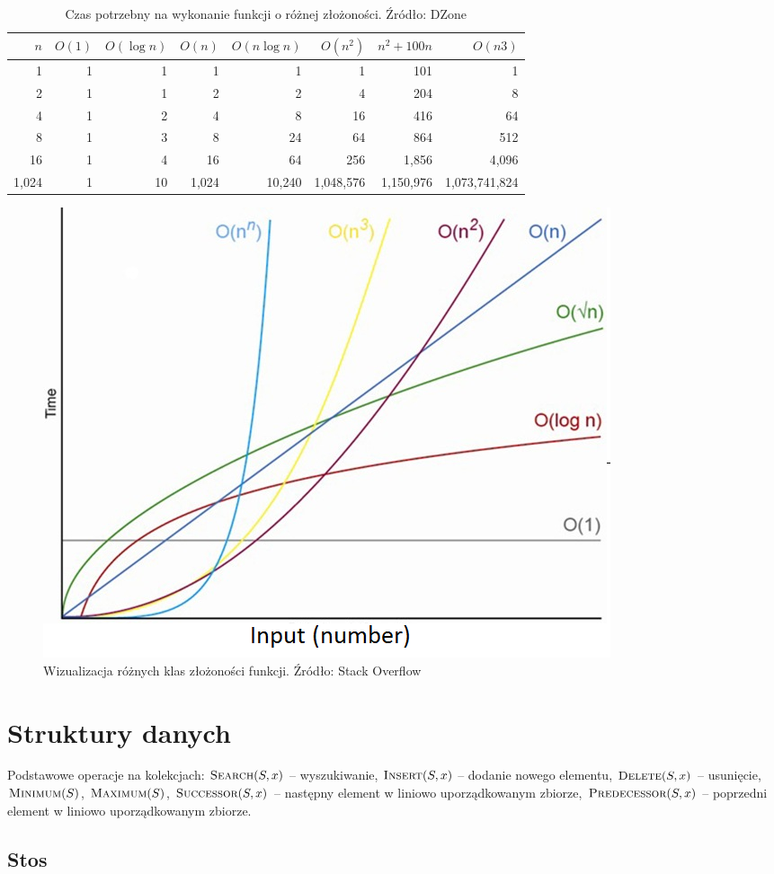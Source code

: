 \documentclass[10pt, oneside]{article}
\theoremstyle{remark}
\begin{document}
\begin{table}[]
\caption{Czas potrzebny na wykonanie funkcji o różnej złożoności. Źródło: DZone}
\centering
\begin{tabular}{@{}rrrrrrrr@{}}
\toprule
$n$ & $O(1)$ & $O(\log n)$ & $O(n)$ & $O(n \log n)$ & $O(n^2)$ & $ n^2 +100n$ & $O(n3)$ \\ \midrule
1 & 1 & 1 & 1 & 1 & 1 & 101 & 1 \\
2 & 1 & 1 & 2 & 2 & 4 & 204 & 8 \\
4 & 1 & 2 & 4 & 8 & 16 & 416 & 64 \\
8 & 1 & 3 & 8 & 24 & 64 & 864 & 512 \\
16 & 1 & 4 & 16 & 64 & 256 & 1,856 & 4,096 \\
1,024 & 1 & 10 & 1,024 & 10,240 & 1,048,576 & 1,150,976 & 1,073,741,824 \\
\bottomrule
\end{tabular}
\end{table}

\begin{figure}
	\centering
	\includegraphics[width=.4\textwidth]{figures/complexities}
	\caption{Wizualizacja różnych klas złożoności funkcji. Źródło: Stack Overflow}
\end{figure}



\section{Struktury danych}
Podstawowe operacje na kolekcjach: $\Call{Search}{S, x}$ -- wyszukiwanie, $\Call{Insert}{S, x}$ -- dodanie nowego elementu, $\Call{Delete}{S, x}$ -- usunięcie, $\Call{Minimum}{S}$, $\Call{Maximum}{S}$, $\Call{Successor}{S, x}$ -- następny element w liniowo uporządkowanym zbiorze, $\Call{Predecessor}{S, x}$ -- poprzedni element w liniowo uporządkowanym zbiorze.

\subsection{Stos}
\end{document}
